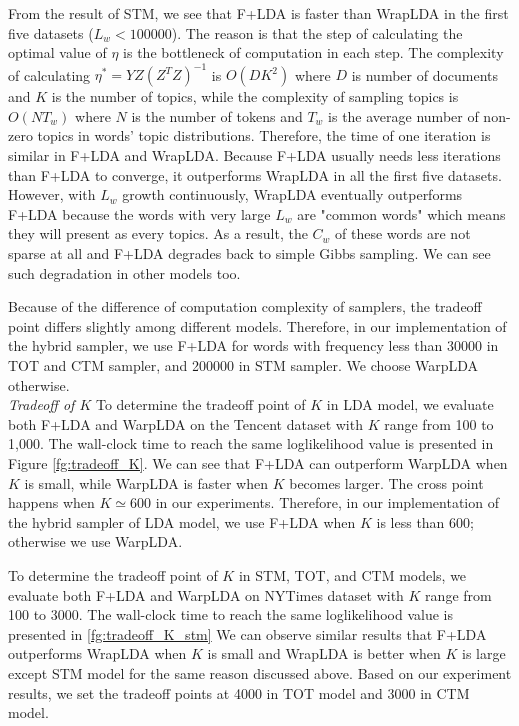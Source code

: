 \documentclass[10pt,journal,cspaper,compsoc]{IEEEtran}
\begin{document}
From the result of STM, we see that F+LDA is faster than WrapLDA
in the first five datasets ($L_w<100000$). The reason is that the step of calculating
the optimal value of $\eta$ is the bottleneck of computation in
each step. The complexity of calculating $\eta^* = YZ(Z^TZ)^{-1}$
is $O(DK^2)$ where $D$ is number of documents and $K$ is the number
of topics, while the complexity of sampling topics is $O(NT_w)$ 
where $N$ is the number of tokens and $T_w$ is the average number
of non-zero topics in words' topic distributions. Therefore, the time of
one iteration is similar in F+LDA and WrapLDA. Because F+LDA usually needs less iterations than F+LDA to converge, it outperforms WrapLDA in all the first five datasets. However, with $L_w$ growth continuously, WrapLDA eventually outperforms F+LDA because the words with very large $L_w$ are "common words" which means they will present as every topics. As a result, the $C_w$ of these words are not sparse at all and F+LDA degrades back to simple Gibbs sampling. We can see such degradation in other models too.

Because of the difference of computation
complexity of samplers, the tradeoff point differs
slightly among different models.
Therefore, in our implementation of the hybrid sampler, we use F+LDA for words with frequency less than 30000 in TOT and CTM sampler, and 200000 in STM sampler. We choose WarpLDA otherwise.
\\

\noindent
{\large \em Tradeoff of $K$}
To determine the tradeoff point of $K$ in LDA model, we evaluate both F+LDA and WarpLDA on the Tencent dataset with $K$ range from 100 to 1,000.
The wall-clock time to reach the same loglikelihood value is presented in Figure \ref{fg:tradeoff_K}.
We can see that F+LDA can outperform WarpLDA when $K$ is small, while WarpLDA is faster when $K$ becomes larger.
The cross point happens when $K \simeq 600$ in our experiments.
Therefore, in our implementation of the hybrid sampler of LDA model, we use F+LDA when $K$ is less than 600; otherwise we use WarpLDA.

To determine the tradeoff point of $K$ in STM, TOT, and CTM models, we evaluate both F+LDA and WarpLDA on NYTimes dataset with
$K$ range from 100 to 3000. The wall-clock time to reach the same
loglikelihood value is presented in \ref{fg:tradeoff_K_stm}  We can observe similar results that F+LDA outperforms WrapLDA when $K$ is small and WrapLDA is better when $K$ is large except STM model for the same reason discussed above. Based on our experiment
results, we set the tradeoff points at 4000 in TOT model and 3000 in CTM model.
\end{document}

